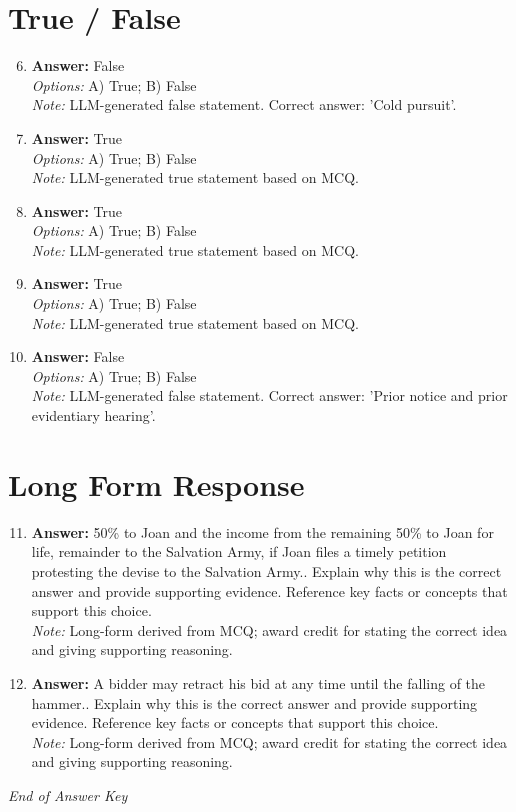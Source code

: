 \documentclass[12pt]{article}
\begin{document}
\section*{True / False}
\begin{enumerate}[label=\arabic*.]
\setcounter{enumi}{5}
\item \textbf{Answer:} False
\\ \textit{Options:} A) True; B) False
\\ \textit{Note:} LLM-generated false statement. Correct answer: 'Cold pursuit'.
\item \textbf{Answer:} True
\\ \textit{Options:} A) True; B) False
\\ \textit{Note:} LLM-generated true statement based on MCQ.
\item \textbf{Answer:} True
\\ \textit{Options:} A) True; B) False
\\ \textit{Note:} LLM-generated true statement based on MCQ.
\item \textbf{Answer:} True
\\ \textit{Options:} A) True; B) False
\\ \textit{Note:} LLM-generated true statement based on MCQ.
\item \textbf{Answer:} False
\\ \textit{Options:} A) True; B) False
\\ \textit{Note:} LLM-generated false statement. Correct answer: 'Prior notice and prior evidentiary hearing'.
\end{enumerate}

\section*{Long Form Response}
\begin{enumerate}[label=\arabic*.]
\setcounter{enumi}{10}
\item \textbf{Answer:} 50\% to Joan and the income from the remaining 50\% to Joan for life, remainder to the Salvation Army, if Joan files a timely petition protesting the devise to the Salvation Army.. Explain why this is the correct answer and provide supporting evidence. Reference key facts or concepts that support this choice.
\\ \textit{Note:} Long-form derived from MCQ; award credit for stating the correct idea and giving supporting reasoning.
\item \textbf{Answer:} A bidder may retract his bid at any time until the falling of the hammer.. Explain why this is the correct answer and provide supporting evidence. Reference key facts or concepts that support this choice.
\\ \textit{Note:} Long-form derived from MCQ; award credit for stating the correct idea and giving supporting reasoning.
\end{enumerate}

\vfill
\noindent\textit{End of Answer Key}
\end{document}
